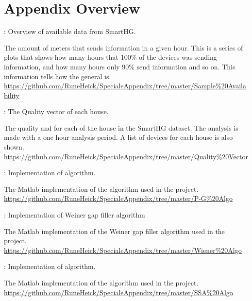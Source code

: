 \chapter*{Appendix Overview}
\label{sec:Appendix}

 : Overview of available data from SmartHG. 
\begin{addmargin}[2.5em]{0.0em}
The amount of meters that sends information in a given hour. This is a series of plots that shows how many hours that 100\% of the devices was sending information, and how many hours only 90\% send information and so on. This information tells how the general  is.\\
\url{https://github.com/RuneHeick/SpecialeAppendix/tree/master/Sample\%20Availability}
\end{addmargin}

 : The Quality vector of each house.
\begin{adjustwidth}{2.5em}{0.0em}
The quality and  for each of the house in the SmartHG dataset. The analysis is made with a one hour analysis period. A list of devices for each house is also shown.\\
\url{https://github.com/RuneHeick/SpecialeAppendix/tree/master/Quality\%20Vector}
\end{adjustwidth}

 : Implementation of  algorithm.
\begin{adjustwidth}{2.5em}{0.0em}
The Matlab implementation of the  algorithm used in the project. \\
\url{https://github.com/RuneHeick/SpecialeAppendix/tree/master/P-G\%20Algo}
\end{adjustwidth}

 : Implementation of Weiner gap filler algorithm
\begin{addmargin}[2.5em]{0.0em}
The Matlab implementation of the Weiner gap filler algorithm used in the project.\\
\url{https://github.com/RuneHeick/SpecialeAppendix/tree/master/Wiener\%20Algo}
\end{addmargin}

 : Implementation of  algorithm.
\begin{adjustwidth}{2.5em}{0.0em}
The Matlab implementation of the  algorithm used in the project. \\
\url{https://github.com/RuneHeick/SpecialeAppendix/tree/master/SSA\%20Algo}
\end{adjustwidth}

